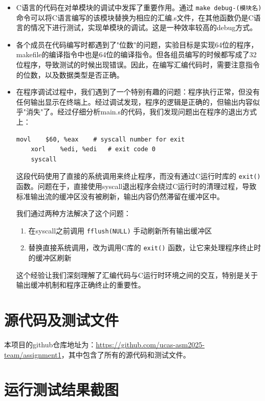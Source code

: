 \documentclass[10pt,a4paper]{article}
\begin{document}
\begin{itemize}
    \item C语言的代码在对单模块的调试中发挥了重要作用。通过 \verb|make debug-(模块名)| 命令可以将C语言编写的该模块替换为相应的汇编.s文件，在其他函数仍是C语言的情况下进行测试，实现单模块的调试。这是一种效率较高的debug方式。
    
    \item 各个成员在代码编写时都遇到了"位数"的问题，实验目标是实现64位的程序，makefile的编译指令中也是64位的编译指令。但各组员编写的时候都写成了32位程序，导致测试的时候出现错误。因此，在编写汇编代码时，需要注意指令的位数，以及数据类型是否正确。
    
    \item 在程序调试过程中，我们遇到了一个特别有趣的问题：程序执行正常，但没有任何输出显示在终端上。经过调试发现，程序的逻辑是正确的，但输出内容似乎"消失"了。经过仔细分析main.s的代码，我们发现问题出在程序的退出方式上：

    \begin{lstlisting}[language={[x86masm]Assembler}]
    movl    $60, %eax    # syscall number for exit
    xorl    %edi, %edi   # exit code 0
    syscall
    \end{lstlisting}

    这段代码使用了直接的系统调用来终止程序，而没有通过C运行时库的 \verb|exit()| 函数。问题在于，直接使用syscall退出程序会绕过C运行时的清理过程，导致标准输出流的缓冲区没有被刷新，输出内容仍然滞留在缓冲区中。

    我们通过两种方法解决了这个问题：
    \begin{enumerate}
        \item 在syscall之前调用 \verb|fflush(NULL)| 手动刷新所有输出缓冲区
        \item 替换直接系统调用，改为调用C库的 \verb|exit()| 函数，让它来处理程序终止时的缓冲区刷新
    \end{enumerate}

    这个经验让我们深刻理解了汇编代码与C运行时环境之间的交互，特别是关于输出缓冲机制和程序正确终止的重要性。
\end{itemize}

\section{源代码及测试文件}

本项目的github仓库地址为：\url{https://github.com/ucas-asm2025-team/assignment1}，其中包含了所有的源代码和测试文件。

\section{运行测试结果截图}
\end{document}

